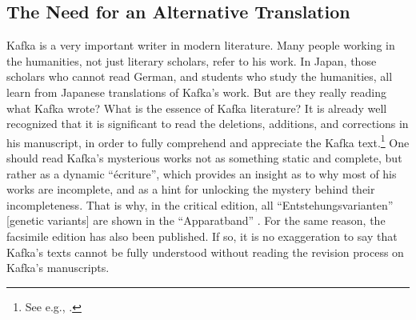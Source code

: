 \begin{paper}
\section{The Need for an Alternative
Translation}\label{the-need-for-an-alternative-translation}

Kafka is a very important writer in modern literature. Many people
working in the humanities, not just literary scholars, refer to his
work. In Japan, those scholars who cannot read German, and students who
study the humanities, all learn from Japanese translations of Kafka's
work. But are they really reading what Kafka wrote? What is the essence
of Kafka literature? It is already well recognized that it is
significant to read the deletions, additions, and corrections in his
manuscript, in order to fully comprehend and appreciate the Kafka
text.\footnote{See e.g., \cite{pasley_schrift_1995,schutterle_franz_2002,battegay_schrift_2010,kleinwort_spate_2013}.} One should read Kafka's mysterious works not as
something static and complete, but rather as a dynamic ``écriture'',
which provides an insight as to why most of his works are incomplete,
and as a hint for unlocking the mystery behind their incompleteness.
That is why, in the critical edition, all ``Entstehungsvarianten'' {[}genetic variants{]} are
shown in the ``Apparatband'' \citep[see][161--350]{kafka_proces_1990}. For the same
reason, the facsimile edition has also been published. If so, it is no
exaggeration to say that Kafka's texts cannot be fully understood
without reading the revision process on Kafka's manuscripts.


\end{paper}
